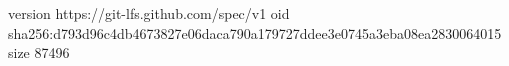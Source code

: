 version https://git-lfs.github.com/spec/v1
oid sha256:d793d96c4db4673827e06daca790a179727ddee3e0745a3eba08ea2830064015
size 87496
